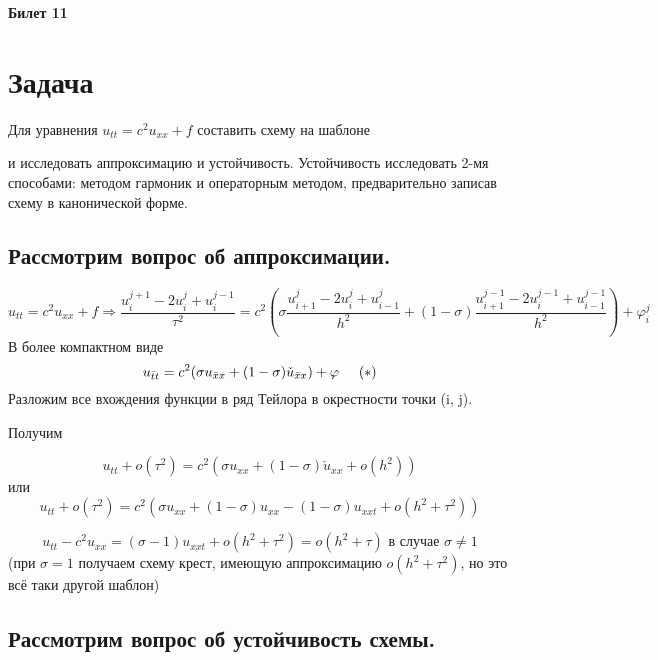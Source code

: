\documentclass[12pt,a4paper]{article}
\begin{document}
\textbf{{\large Билет 11}}
\section{Задача}
Для уравнения $u_{tt}=c^2u_{xx} + f$ составить схему на шаблоне \quad{} 

\begin{flushleft}
и исследовать аппроксимацию и устойчивость. Устойчивость исследовать 2-мя способами: методом гармоник и операторным методом, предварительно записав схему в канонической форме. 
\end{flushleft}

\subsection{Рассмотрим вопрос об аппроксимации.}

$$u_{tt} = c^2u_{xx} + f \Rightarrow \frac{u_i^{j+1}- 2u_i^j + u_i^{j-1}}{\tau^2} = c^2\left( \sigma\frac{u_{i+1}^j- 2u_i^j + u_{i-1}^j}{h^2} + (1-\sigma)\frac{u_{i+1}^{j-1}- 2u_i^{j-1} + u_{i-1}^{j-1}}{h^2}\right)  + \varphi_i^j$$
В более компактном виде 
$$ u_{\bar{t}t} = c^2(\sigma u_{\bar{x}x} + (1-\sigma)\check{u}_{\bar{x}x})  + \varphi \hspace{0.5cm}(*)$$
Разложим все вхождения функции в ряд Тейлора в окрестности точки (i, j).

\begin{flushleft}
Получим
\end{flushleft}
$$ u_{tt} + o(\tau^2) = c^2(\sigma u_{xx} + (1-\sigma)\check{u}_{xx} + o(h^2)) $$
или $$ u_{tt} + o(\tau^2) = c^2(\sigma u_{xx} + (1-\sigma)u_{xx} - (1-\sigma)u_{xxt} + o(h^2 + \tau^2)) $$

$$u_{tt} - c^2u_{xx} = (\sigma - 1)u_{xxt} + o(h^2 + \tau^2) = o(h^2 + \tau)\text{ в случае }\sigma\neq 1$$
(при $\sigma =1$ получаем схему крест, имеющую аппроксимацию $o(h^2 + \tau^2)$, но это всё таки другой шаблон)

\subsection{Рассмотрим вопрос об устойчивость схемы.}
\end{document}
